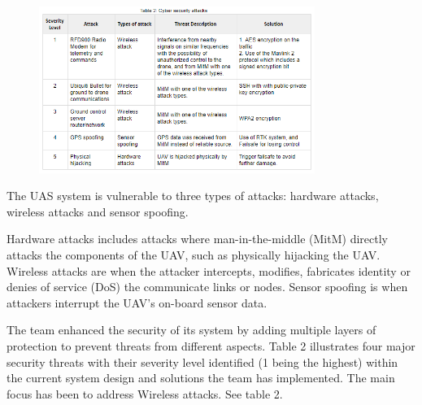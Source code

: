 \begin{figure}[ht]\centering
\includegraphics[width=0.8\textwidth]{table/Table_2_cyber_security_attacks.PNG}
\caption*{}
\label{fig:cs}
\end{figure}
The UAS system is vulnerable to three types of attacks: hardware attacks, wireless attacks and sensor spoofing. 

Hardware attacks includes attacks where man-in-the-middle (MitM) directly attacks the components of the UAV, such as physically hijacking the UAV. Wireless attacks are when the attacker intercepts, modifies, fabricates identity or denies of service (DoS) the communicate links or nodes. Sensor spoofing is when attackers interrupt the UAV’s on-board sensor data.



The team enhanced the security of its system by adding multiple layers of protection to prevent threats from different aspects. Table 2 illustrates four major security threats with their severity level identified (1 being the highest) within the current system design and solutions the team has implemented. The main focus has been to address Wireless attacks. See table 2.




    
